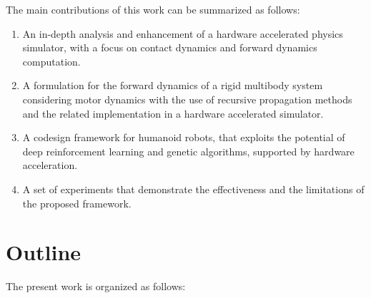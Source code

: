 The main contributions of this work can be summarized as follows:

\begin{enumerate}
    \item An in-depth analysis and enhancement of a hardware accelerated physics simulator, with a focus on contact dynamics and forward dynamics computation.
    \item A formulation for the forward dynamics of a rigid multibody system considering motor dynamics with the use of recursive propagation methods and the related implementation in a hardware accelerated simulator.
    \item A codesign framework for humanoid robots, that exploits the potential of deep reinforcement learning and genetic algorithms, supported by hardware acceleration.
    \item A set of experiments that demonstrate the effectiveness and the limitations of the proposed framework.
\end{enumerate}

\clearpage

\section*{Outline}

The present work is organized as follows:

